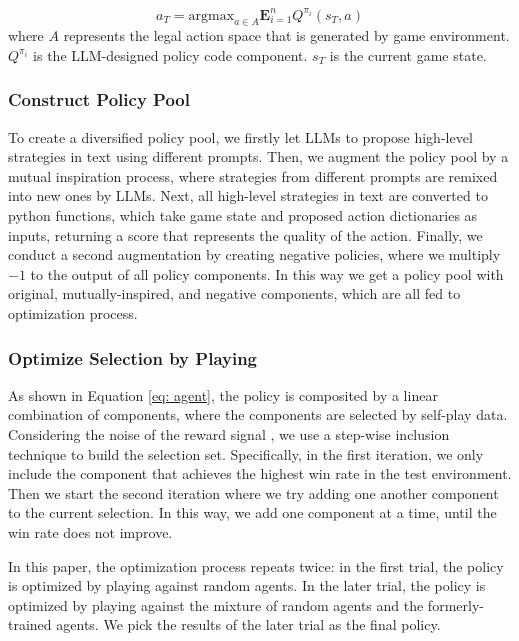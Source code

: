 \begin{equation} 
    a_T = \text{argmax}_{a \in A} \mathbf{E}_{i=1}^n Q^{\pi_i}(s_T, a) 
    \label{eq: agent}
\end{equation}
where $A$ represents the legal action space that is generated by game environment. $Q^{\pi_i}$ is the LLM-designed policy code component. $s_T$ is the current game state. 


\subsubsection{Construct Policy Pool}

To create a diversified policy pool, we firstly let LLMs to propose high-level strategies in text using different prompts. Then, we augment the policy pool by a mutual inspiration process, where strategies from different prompts are remixed into new ones by LLMs. Next, all high-level strategies in text are converted to python functions, which take game state and proposed action dictionaries as inputs, returning a score that represents the quality of the action.
Finally, we conduct a second augmentation by creating negative policies, where we multiply $-1$ to the output of all policy components. In this way we get a policy pool with original, mutually-inspired, and negative components, which are all fed to optimization process.



\subsubsection{Optimize Selection by Playing}


As shown in Equation \ref{eq: agent}, the policy is composited by a linear combination of components, where the components are selected by self-play data. Considering the noise of the reward signal \cite{light2024strategist}, we use a step-wise inclusion technique to build the selection set. Specifically, in the first iteration, we only include the component that achieves the highest win rate in the test environment. Then we start the second iteration where we try adding one another component to the current selection. In this way, we add one component at a time, until the win rate does not improve.


In this paper, the optimization process repeats twice: in the first trial, the policy is optimized by playing against random agents. In the later trial, the policy is optimized by playing against the mixture of random agents and the formerly-trained agents. We pick the results of the later trial as the final policy.
